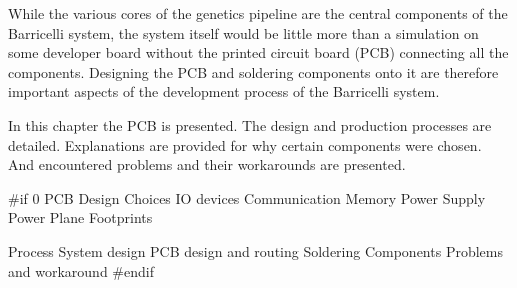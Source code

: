 
While the various cores of the genetics pipeline are the central components of the Barricelli system, the system itself would be little more than a simulation on some developer board without the printed circuit board (PCB) connecting all the components.
Designing the PCB and soldering components onto it are therefore important aspects of the development process of the Barricelli system.

In this chapter the PCB is presented.
The design and production processes are detailed.
Explanations are provided for why certain components were chosen.
And encountered problems and their workarounds are presented.

 \label{pcb:section:design_choices}

 \label{pcb:section:power_supply}

 \label{pcb:section:power_plane}

 \label{pcb:section:footprints}

 \label{pcb:section:process}

 \label{pcb:section:components}

 \label{pcb:section:problems_and_workaround}

\#if 0
PCB
    Design Choices
        IO devices
        Communication
        Memory
    Power Supply
    Power Plane
    Footprints
        
    Process
        System design
        PCB design and routing
        Soldering
    Components
    Problems and workaround
\#endif
